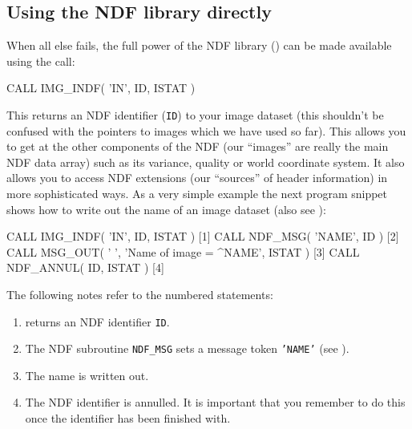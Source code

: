 \documentclass[twoside,11pt,nolof]{starlink}
\providecommand{\myverb}[1]{{\texttt{#1}}}
\providecommand{\mynote}{The following notes refer to the numbered statements:}
\newenvironment{code}{\begin{small}}
                     {\end{small}}
\newenvironment{enumnotes}
{
   \renewcommand{\labelenumi}{\myverb{[\theenumi]}}
   \begin{enumerate}
}{
   \end{enumerate}
   \renewcommand{\labelenumi}{\theenumi}
}
\begin{document}
\subsection{Using the NDF library directly}
When all else fails, the full power of the NDF library
() can be made available using the call:
\begin{code}
\begin{terminalv}
      CALL IMG_INDF( 'IN', ID, ISTAT )
\end{terminalv}
\end{code}
This returns an NDF identifier (\myverb{ID}) to your image dataset
(this shouldn't be confused with the pointers to images which we have
used so far). This allows you to get at the other components of the
NDF (our ``images'' are really the main NDF data array) such as its
variance, quality or world coordinate system. It also allows you to
access NDF extensions (our ``sources'' of header information) in more
sophisticated ways.  As a very simple example the next program snippet
shows how to write out the name of an image dataset
(also see ):
\begin{code}
\begin{terminalv}
      CALL IMG_INDF( 'IN', ID, ISTAT )                        [1]
      CALL NDF_MSG( 'NAME', ID )                              [2]
      CALL MSG_OUT( ' ', 'Name of image = ^NAME', ISTAT )     [3]
      CALL NDF_ANNUL( ID, ISTAT )                             [4]
\end{terminalv}
\end{code}
\mynote
\begin{enumnotes}
\item
\htmlref{\myverb{IMG\_INDF}}{IMG_INDF} returns an NDF identifier \myverb{ID}.

\item
The NDF subroutine \myverb{NDF\_MSG} sets a message token \myverb{'NAME'}
(see ).

\item
The name is written out.

\item
The NDF identifier is annulled. It is important that you remember to
do this once the identifier has been finished with.
\end{enumnotes}
\end{document}
